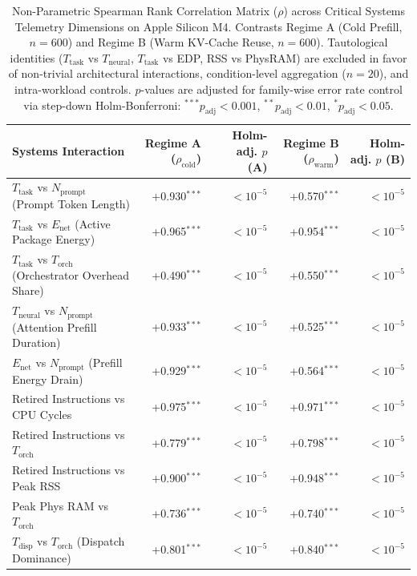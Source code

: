 \begin{table}[t]
\centering
\caption{Non-Parametric Spearman Rank Correlation Matrix ($\rho$) across Critical Systems Telemetry Dimensions on Apple Silicon M4. Contrasts Regime A (Cold Prefill, $n=600$) and Regime B (Warm KV-Cache Reuse, $n=600$). Tautological identities ($T_{\text{task}}$ vs $T_{\text{neural}}$, $T_{\text{task}}$ vs EDP, RSS vs PhysRAM) are excluded in favor of non-trivial architectural interactions, condition-level aggregation ($n=20$), and intra-workload controls. $p$-values are adjusted for family-wise error rate control via step-down Holm-Bonferroni: $^{***}p_{\text{adj}} < 0.001$, $^{**}p_{\text{adj}} < 0.01$, $^{*}p_{\text{adj}} < 0.05$.}
\label{tab:spearman_correlation}
\small
\begin{tabular}{l r r r r}
\hline
\textbf{Systems Interaction} & \textbf{Regime A ($\rho_{\text{cold}}$)} & \textbf{Holm-adj. $p$ (A)} & \textbf{Regime B ($\rho_{\text{warm}}$)} & \textbf{Holm-adj. $p$ (B)} \\
\hline
$T_{\text{task}}$ vs $N_{\text{prompt}}$ (Prompt Token Length) & +0.930$^{***}$ & $< 10^{-5}$ & +0.570$^{***}$ & $< 10^{-5}$ \\
$T_{\text{task}}$ vs $E_{\text{net}}$ (Active Package Energy) & +0.965$^{***}$ & $< 10^{-5}$ & +0.954$^{***}$ & $< 10^{-5}$ \\
$T_{\text{task}}$ vs $T_{\text{orch}}$ (Orchestrator Overhead Share) & +0.490$^{***}$ & $< 10^{-5}$ & +0.550$^{***}$ & $< 10^{-5}$ \\
$T_{\text{neural}}$ vs $N_{\text{prompt}}$ (Attention Prefill Duration) & +0.933$^{***}$ & $< 10^{-5}$ & +0.525$^{***}$ & $< 10^{-5}$ \\
$E_{\text{net}}$ vs $N_{\text{prompt}}$ (Prefill Energy Drain) & +0.929$^{***}$ & $< 10^{-5}$ & +0.564$^{***}$ & $< 10^{-5}$ \\
Retired Instructions vs CPU Cycles & +0.975$^{***}$ & $< 10^{-5}$ & +0.971$^{***}$ & $< 10^{-5}$ \\
Retired Instructions vs $T_{\text{orch}}$ & +0.779$^{***}$ & $< 10^{-5}$ & +0.798$^{***}$ & $< 10^{-5}$ \\
Retired Instructions vs Peak RSS & +0.900$^{***}$ & $< 10^{-5}$ & +0.948$^{***}$ & $< 10^{-5}$ \\
Peak Phys RAM vs $T_{\text{orch}}$ & +0.736$^{***}$ & $< 10^{-5}$ & +0.740$^{***}$ & $< 10^{-5}$ \\
$T_{\text{disp}}$ vs $T_{\text{orch}}$ (Dispatch Dominance) & +0.801$^{***}$ & $< 10^{-5}$ & +0.840$^{***}$ & $< 10^{-5}$ \\

\end{tabular}
\end{table}
